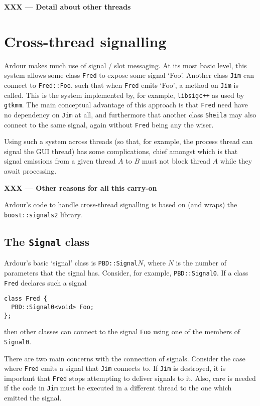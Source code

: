 \documentclass[10pt,a4paper]{book}
\newcommand{\todo}[1]{\textbf{XXX --- #1}}
\newcommand{\code}[1]{\texttt{#1}}
\begin{document}
\todo{Detail about other threads}


\section{Cross-thread signalling}

Ardour makes much use of signal / slot messaging.  At its most basic
level, this system allows some class \code{Fred} to expose some
signal `Foo'.  Another class \code{Jim} can connect to
\code{Fred::Foo}, such that when \code{Fred} emits `Foo', a method
on \code{Jim} is called.  This is the system implemented by, for
example, \code{libsigc++} as used by \code{gtkmm}.  The main
conceptual advantage of this approach is that \code{Fred} need have
no dependency on \code{Jim} at all, and furthermore that another
class \code{Sheila} may also connect to the same signal, again
without \code{Fred} being any the wiser.

Using such a system across threads (so that, for example, the process
thread can signal the GUI thread) has some complications, chief
amongst which is that signal emissions from a given thread $A$ to $B$
must not block thread $A$ while they await processing.

\todo{Other reasons for all this carry-on}

Ardour's code to handle cross-thread signalling is based on (and
wraps) the \code{boost::signals2} library.

\subsection{The \code{Signal} class}

Ardour's basic `signal' class is \code{PBD::Signal}$N$, where $N$ is
the number of parameters that the signal has.  Consider, for example,
\code{PBD::Signal0}.  If a class \code{Fred} declares such a signal

\begin{lstlisting}
class Fred {
  PBD::Signal0<void> Foo;
};
\end{lstlisting}

then other classes can connect to the signal \code{Foo} using one of
the members of \code{Signal0}.

There are two main concerns with the connection of signals.  Consider
the case where \code{Fred} emits a signal that \code{Jim} connects to.
If \code{Jim} is destroyed, it is important that \code{Fred} stops
attempting to deliver signals to it.  Also, care is needed if the code
in \code{Jim} must be executed in a different thread to the one which
emitted the signal.
\end{document}
